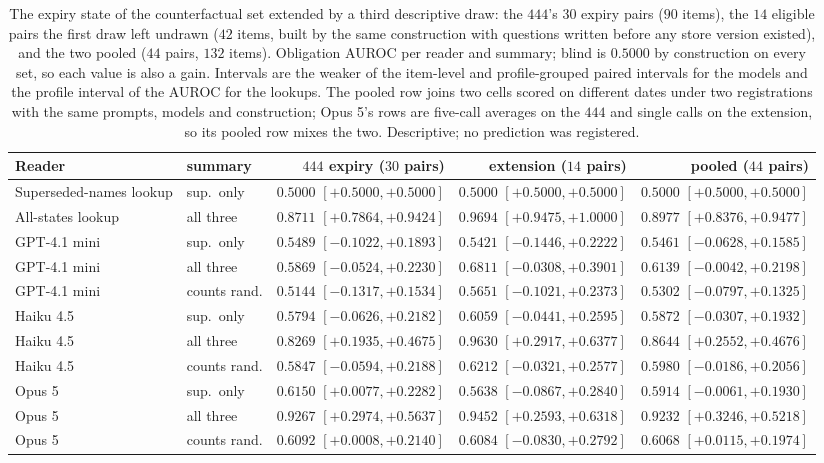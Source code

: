 \begin{table}[H]
\caption{The expiry state of the counterfactual set extended by a third descriptive draw: the $444$'s $30$ expiry pairs ($90$ items), the $14$ eligible pairs the first draw left undrawn ($42$ items, built by the same construction with questions written before any store version existed), and the two pooled ($44$ pairs, $132$ items). Obligation AUROC per reader and summary; blind is $0.5000$ by construction on every set, so each value is also a gain. Intervals are the weaker of the item-level and profile-grouped paired intervals for the models and the profile interval of the AUROC for the lookups. The pooled row joins two cells scored on different dates under two registrations with the same prompts, models and construction; Opus 5's rows are five-call averages on the $444$ and single calls on the extension, so its pooled row mixes the two. Descriptive; no prediction was registered.}
\label{tab:cf3-expiry}
\centering
\scriptsize
\setlength{\tabcolsep}{2.5pt}
\begin{tabular}{@{}llrrr@{}}
\toprule
Reader & summary & $444$ expiry ($30$ pairs) & extension ($14$ pairs) & pooled ($44$ pairs) \\
\midrule
Superseded-names lookup & sup.\ only & $0.5000$ $[+0.5000,+0.5000]$ & $0.5000$ $[+0.5000,+0.5000]$ & $0.5000$ $[+0.5000,+0.5000]$ \\
All-states lookup & all three & $0.8711$ $[+0.7864,+0.9424]$ & $0.9694$ $[+0.9475,+1.0000]$ & $0.8977$ $[+0.8376,+0.9477]$ \\
GPT-4.1 mini & sup.\ only & $0.5489$ $[-0.1022,+0.1893]$ & $0.5421$ $[-0.1446,+0.2222]$ & $0.5461$ $[-0.0628,+0.1585]$ \\
GPT-4.1 mini & all three & $0.5869$ $[-0.0524,+0.2230]$ & $0.6811$ $[-0.0308,+0.3901]$ & $0.6139$ $[-0.0042,+0.2198]$ \\
GPT-4.1 mini & counts rand. & $0.5144$ $[-0.1317,+0.1534]$ & $0.5651$ $[-0.1021,+0.2373]$ & $0.5302$ $[-0.0797,+0.1325]$ \\
Haiku 4.5 & sup.\ only & $0.5794$ $[-0.0626,+0.2182]$ & $0.6059$ $[-0.0441,+0.2595]$ & $0.5872$ $[-0.0307,+0.1932]$ \\
Haiku 4.5 & all three & $0.8269$ $[+0.1935,+0.4675]$ & $0.9630$ $[+0.2917,+0.6377]$ & $0.8644$ $[+0.2552,+0.4676]$ \\
Haiku 4.5 & counts rand. & $0.5847$ $[-0.0594,+0.2188]$ & $0.6212$ $[-0.0321,+0.2577]$ & $0.5980$ $[-0.0186,+0.2056]$ \\
Opus 5 & sup.\ only & $0.6150$ $[+0.0077,+0.2282]$ & $0.5638$ $[-0.0867,+0.2840]$ & $0.5914$ $[-0.0061,+0.1930]$ \\
Opus 5 & all three & $0.9267$ $[+0.2974,+0.5637]$ & $0.9452$ $[+0.2593,+0.6318]$ & $0.9232$ $[+0.3246,+0.5218]$ \\
Opus 5 & counts rand. & $0.6092$ $[+0.0008,+0.2140]$ & $0.6084$ $[-0.0830,+0.2792]$ & $0.6068$ $[+0.0115,+0.1974]$ \\
\bottomrule
\end{tabular}
\end{table}

